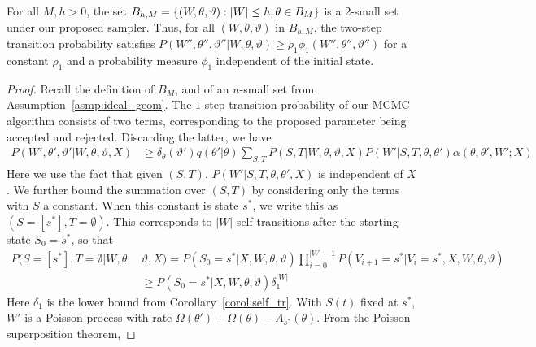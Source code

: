 \begin{lemma}
  For all $M,h > 0$, the set $B_{h,M} =
\left\lbrace (W, \theta, \vartheta) : |W| \leq h, \theta \in B_M
\right\rbrace$ is a 2-small set under our proposed sampler. 
Thus, for all $(W,\theta,\vartheta)$ {in $B_{h, M}$},
the two-step transition probability satisfies 
$P(W'', \theta'',\vartheta'' | W, \theta, \vartheta) \ge \rho_1 
\phi_1(W{''}, \theta'',\vartheta'') $ for a constant $\rho_1$ and a 
probability measure $\phi_1$ independent of the initial state.
\label{lem:small_set}
\end{lemma}
\begin{proof} Recall the definition of $B_M$, and of an $n$-small set from 
  Assumption~\ref{asmp:ideal_geom}. The $1$-step transition probability of our MCMC algorithm
  consists of two terms, corresponding to the proposed parameter being
  accepted and rejected. Discarding the latter, we have %
\begin{align*}
  P(W',\theta',\vartheta'|W,\theta,\vartheta,X)&\geq
  \delta_\theta(\vartheta') q(\theta'|\theta)
 \sum_{S,T}  P(S,T | W, \theta, \vartheta, X) 
             P(W'| S, T, \theta, \theta')
             \alpha(\theta, \theta', W';X)
\end{align*}
Here we use the fact that given $(S,T)$,
$P(W'|S,T,\theta,\theta',X)$ is independent of  $X$.
We further bound the summation over $(S,T)$ by considering only the terms
with $S$ a constant. When this constant is  state $s^*$, we write this as 
$(S=[s^*], T= \emptyset)$. This corresponds to $|W|$ self-transitions 
after the starting state $S_0=s^*$, so that
\begin{align*}
  P(S=[s^*], T = \emptyset | W, \theta, &\vartheta, X) =
P(S_0=s^*|X,W, \theta, \vartheta)\prod_{i = 0}^{|W| - 1} 
P(V_{i + 1} = s^* | V_i = s^*,X,W,\theta,\vartheta) \\ 
& \geq P(S_0=s^*|X,W, \theta, \vartheta)\delta_1^{|W|} %
\end{align*}
Here $\delta_1$ is the lower bound from Corollary~\ref{corol:self_tr}.
With $S(t)$ fixed at $s^*$, $W'$ is a Poisson process with rate
$\Omega(\theta') + \Omega(\theta) - A_{s^*}(\theta)$.
From the %
Poisson superposition theorem,

\end{proof}
